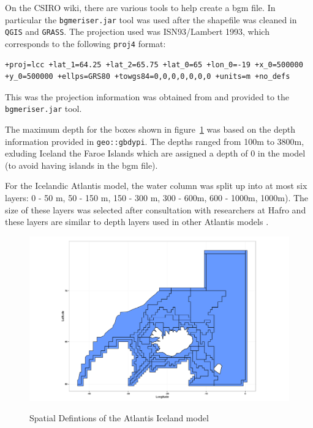 \documentclass{report}
\begin{document}
On the CSIRO wiki, there are various tools to help create a bgm file. In particular the \texttt{bgmeriser.jar} tool was used after the shapefile was cleaned in \texttt{QGIS} and \texttt{GRASS}. The projection used was ISN93/Lambert 1993, which corresponds to the following \texttt{proj4} format:   

\begin{small}
\begin{verbatim}
+proj=lcc +lat_1=64.25 +lat_2=65.75 +lat_0=65 +lon_0=-19 +x_0=500000 
+y_0=500000 +ellps=GRS80 +towgs84=0,0,0,0,0,0,0 +units=m +no_defs 
\end{verbatim}
\end{small}

This was the projection information was obtained from \cite{proj4iceland} and provided to the \texttt{bgmeriser.jar} tool.

 The maximum depth for the boxes shown in figure~\ref{ref:spdef} was based on the depth information provided in \texttt{geo::gbdypi}. The depths ranged from 100m to 3800m, exluding Iceland the Faroe Islands which are assigned a depth of 0 in the model (to avoid having islands in the bgm file).
 
 For the Icelandic Atlantis model, the water column was split up into at most six layers: 0 - 50 m, 50 - 150 m, 150 - 300 m, 300 - 600m, 600 - 1000m, 1000m). The size of these layers was selected after consultation with researchers at Hafro and these layers are similar to depth layers used in other Atlantis models \cite{link2010northeast, savina2008ecologically}.


\begin{center}
\begin{figure}
\caption{Spatial Defintions of the Atlantis Iceland model}
\includegraphics[scale=.3]{maps/atlantis_iceland_WGS84.png}
\label{ref:spdef}
\end{figure}
\end{center}
\end{document}
